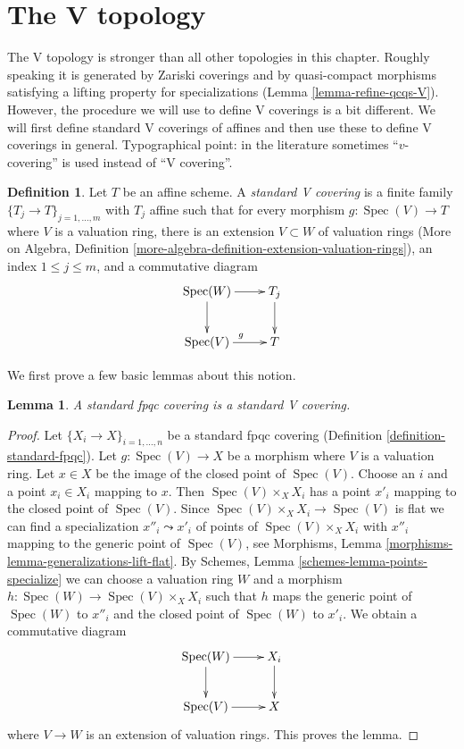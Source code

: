 \documentclass{stacks-project}
\theoremstyle{plain}
\newtheorem{lemma}[subsection]{Lemma}
\theoremstyle{definition}
\newtheorem{definition}[subsection]{Definition}
\theoremstyle{remark}
\numberwithin{equation}{subsection}
\def\Spec{\mathop{\mathrm{Spec}}}
\begin{document}
\section{The V topology}
\label{section-V}

\noindent
The V topology is stronger than all other topologies in this chapter.
Roughly speaking it is generated by Zariski coverings and
by quasi-compact morphisms satisfying a lifting property
for specializations (Lemma \ref{lemma-refine-qcqs-V}).
However, the procedure we will use to define V coverings is a bit different.
We will first define standard V coverings of affines and then
use these to define V coverings in general. Typographical point:
in the literature sometimes ``$v$-covering'' is used instead of ``V covering''.

\begin{definition}
\label{definition-standard-V-covering}
Let $T$ be an affine scheme. A {\it standard V covering} is a finite family
$\{T_j \to T\}_{j = 1, \ldots, m}$ with $T_j$ affine
such that for every morphism $g : \Spec(V) \to T$ where $V$
is a valuation ring, there is an extension $V \subset W$ of valuation rings
(More on Algebra, Definition
\ref{more-algebra-definition-extension-valuation-rings}),
an index $1 \leq j \leq m$, and a commutative diagram
$$
\xymatrix{
\Spec(W) \ar[r] \ar[d] & T_j \ar[d] \\
\Spec(V) \ar[r]^g & T
}
$$
\end{definition}

\noindent
We first prove a few basic lemmas about this notion.

\begin{lemma}
\label{lemma-standard-fpqc-standard-V}
A standard fpqc covering is a standard V covering.
\end{lemma}

\begin{proof}
Let $\{X_i \to X\}_{i = 1, \ldots, n}$ be a standard fpqc covering
(Definition \ref{definition-standard-fpqc}). Let $g : \Spec(V) \to X$
be a morphism where $V$ is a valuation ring. Let $x \in X$ be the
image of the closed point of $\Spec(V)$. Choose an $i$ and a point
$x_i \in X_i$ mapping to $x$. Then $\Spec(V) \times_X X_i$
has a point $x'_i$ mapping to the closed point of $\Spec(V)$.
Since $\Spec(V) \times_X X_i \to \Spec(V)$ is flat
we can find a specialization $x''_i \leadsto x'_i$ of
points of $\Spec(V) \times_X X_i$ with $x''_i$ mapping to
the generic point of $\Spec(V)$, see
Morphisms, Lemma \ref{morphisms-lemma-generalizations-lift-flat}. By
Schemes, Lemma \ref{schemes-lemma-points-specialize}
we can choose a valuation ring $W$ and a morphism
$h : \Spec(W) \to \Spec(V) \times_X X_i$ such that $h$
maps the generic point of $\Spec(W)$ to $x''_i$ and the
closed point of $\Spec(W)$ to $x'_i$. We obtain a
commutative diagram
$$
\xymatrix{
\Spec(W) \ar[r] \ar[d] & X_i \ar[d] \\
\Spec(V) \ar[r] & X
}
$$
where $V \to W$ is an extension of valuation rings.
This proves the lemma.
\end{proof}
\end{document}
